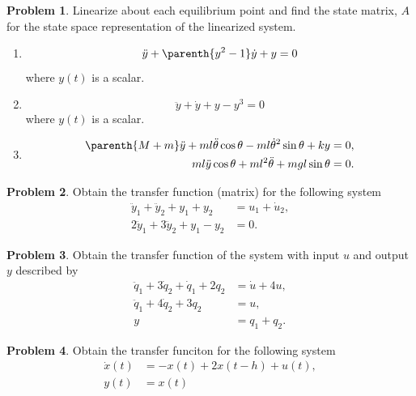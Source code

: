 \documentclass[10pt]{article}
\theoremstyle{definition}
\newtheorem{prob}{Problem}[section]
\newenvironment{subprob}%
{\renewcommand{\theenumi}{\alph{enumi}}\renewcommand{\labelenumi}{(\theenumi)}\begin{enumerate}}%
{\end{enumerate}}%
\begin{document}
\begin{prob}
    Linearize about each equilibrium point and find the state matrix, \( A \) for the state space representation of the linearized system.

    \begin{subprob}
        \item \[ \ddot y + \parenth{y^2 - 1} \dot y + y = 0\] where \( y(t) \) is a scalar.
        \item \[ \ddot y + \dot y + y - y^3 = 0 \] where \( y(t) \) is a scalar.
        \item \begin{align*}
                \parenth{M + m} \ddot y + ml \ddot \theta \cos \theta - ml \dot \theta^2 \sin \theta + ky &= 0, \\
                m l \ddot y \cos \theta + ml^2 \ddot \theta + m g l \sin \theta &=0.
            \end{align*}
    
    \end{subprob}
\end{prob}

\begin{prob}
    Obtain the transfer function (matrix) for the following system
    \begin{align*}
        \ddot y_1 + \ddot y_2 + y_1 + y_2 &=  u_1 + \dot u_2 , \\
        2 \ddot y_1 + 3 \ddot y_2 + y_1 - y_2 &= 0 .
    \end{align*}
\end{prob}

\begin{prob}
    Obtain the transfer function of the system with input \( u \) and output \( y \) described by
    \begin{align*}
        \ddot q_1 + 3 \dot q_2 + \dot q_1 + 2 q_2 &= \dot u + 4 u , \\
        \ddot q_1 + 4 \dot q_2 + 3 q_2 &= u , \\
        y & =  q_1 + q_2.
    \end{align*}
\end{prob}

\begin{prob}
    Obtain the transfer funciton for the following system
    \begin{align*}
        \dot x(t) &= - x(t) + 2 x(t-h) + u(t) , \\
        y(t) &= x(t)
    \end{align*}
\end{prob}
\end{document}
